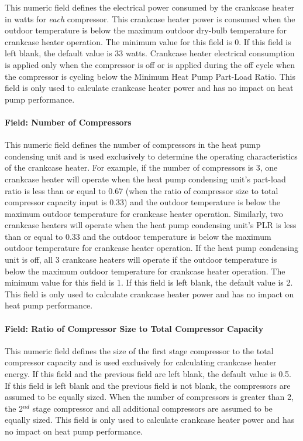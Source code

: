 This numeric field defines the electrical power consumed by the crankcase heater in watts for \emph{each} compressor. This crankcase heater power is consumed when the outdoor temperature is below the maximum outdoor dry-bulb temperature for crankcase heater operation. The minimum value for this field is 0. If this field is left blank, the default value is 33 watts. Crankcase heater electrical consumption is applied only when the compressor is off or is applied during the off cycle when the compressor is cycling below the Minimum Heat Pump Part-Load Ratio. This field is only used to calculate crankcase heater power and has no impact on heat pump performance.

\paragraph{Field: Number of Compressors}\label{field-number-of-compressors-000}

This numeric field defines the number of compressors in the heat pump condensing unit and is used exclusively to determine the operating characteristics of the crankcase heater. For example, if the number of compressors is 3, one crankcase heater will operate when the heat pump condensing unit's part-load ratio is less than or equal to 0.67 (when the ratio of compressor size to total compressor capacity input is 0.33) and the outdoor temperature is below the maximum outdoor temperature for crankcase heater operation. Similarly, two crankcase heaters will operate when the heat pump condensing unit's PLR is less than or equal to 0.33 and the outdoor temperature is below the maximum outdoor temperature for crankcase heater operation. If the heat pump condensing unit is off, all 3 crankcase heaters will operate if the outdoor temperature is below the maximum outdoor temperature for crankcase heater operation. The minimum value for this field is 1. If this field is left blank, the default value is 2. This field is only used to calculate crankcase heater power and has no impact on heat pump performance.

\paragraph{Field: Ratio of Compressor Size to Total Compressor Capacity}\label{field-ratio-of-compressor-size-to-total-compressor-capacity-000}

This numeric field defines the size of the first stage compressor to the total compressor capacity and is used exclusively for calculating crankcase heater energy. If this field and the previous field are left blank, the default value is 0.5.~ If this field is left blank and the previous field is not blank, the compressors are assumed to be equally sized. When the number of compressors is greater than 2, the 2\(^{nd}\) stage compressor and all additional compressors are assumed to be equally sized. This field is only used to calculate crankcase heater power and has no impact on heat pump performance.

